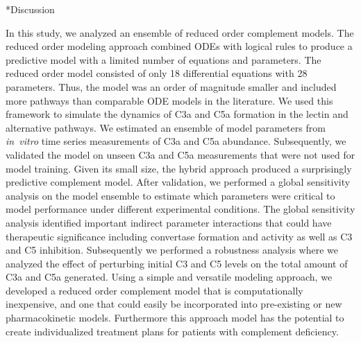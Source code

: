 \documentclass[12pt]{article}
\makeatletter
\renewcommand\section{\@startsection
	{subsection}{2}{0mm}
	{-0.2in}
	{0.05\baselineskip}
	{\normalfont\large\bfseries}}
\makeatother
\begin{document}
\clearpage


\section*{Discussion}

In this study, we analyzed an ensemble of reduced order complement models.
The reduced order modeling approach combined ODEs with logical rules to produce a predictive model with a limited number of equations and parameters.
The reduced order model consisted of only 18 differential equations with 28 parameters.
Thus, the model was an order of magnitude smaller and included more pathways than comparable ODE models in the literature.
We used this framework to simulate the dynamics of C3a and C5a formation in the lectin and alternative pathways.
We estimated an ensemble of model parameters from \textit{in~vitro} time series measurements of C3a and C5a abundance.
Subsequently, we validated the model on unseen C3a and C5a measurements that were not used for model training.
Given its small size, the hybrid approach produced a surprisingly predictive complement model.
After validation, we performed a global sensitivity analysis on the model ensemble to estimate which parameters were critical to model performance under different experimental conditions.
The global sensitivity analysis identified important indirect parameter interactions that could have therapeutic significance including convertase formation and activity as well as C3 and C5 inhibition. Subsequently we performed a robustness analysis where we analyzed the effect of perturbing initial C3 and C5 levels on the total amount of C3a and C5a generated.
Using a simple and versatile modeling approach, we developed a reduced order complement model that is computationally inexpensive, and one that could easily be incorporated into pre-existing or new pharmacokinetic models. Furthermore this approach model has the potential to create individualized treatment plans for patients with complement deficiency.
\end{document}
